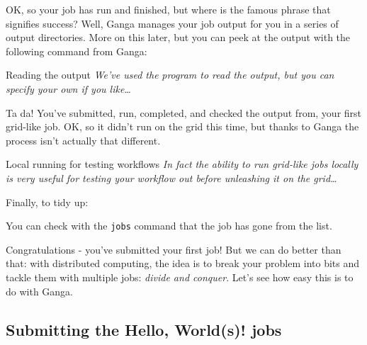 OK, so your job has run and finished, but where is the famous phrase
that signifies success? Well, Ganga manages your job output for you in a
series of output directories. More on this later, but you can peek at
the output with the following command from Ganga:

\begin{Shaded}
\begin{Highlighting}[]
 \NormalTok{, }\NormalTok{)}
 
\end{Highlighting}
\end{Shaded}

\begin{infobox}{Reading the output}
\emph{We've used the}  \emph{program to read the output, but you can specify your
own if you like\ldots{}}
\end{infobox}

Ta da! You've submitted, run, completed, and checked the output from,
your first grid-like job. OK, so it didn't run on the grid this time,
but thanks to Ganga the process isn't actually that different.

\begin{infobox}{Local running for testing workflows}
\emph{In fact the ability to run grid-like jobs locally is very useful for
testing your workflow out before unleashing it on the grid\ldots{}}
\end{infobox}

Finally, to tidy up:

\begin{Shaded}
\begin{Highlighting}[]
 
     
\end{Highlighting}
\end{Shaded}

You can check with the \texttt{jobs} command that the job has gone from
the list.

Congratulations - you've submitted your first job! But we can do better
than that: with distributed computing, the idea is to break your problem
into bits and tackle them with multiple jobs: \emph{divide and conquer}.
Let's see how easy this is to do with Ganga.

\subsection{Submitting the Hello, World(s)!
jobs}\label{submitting-the-hello-worlds-jobs}

